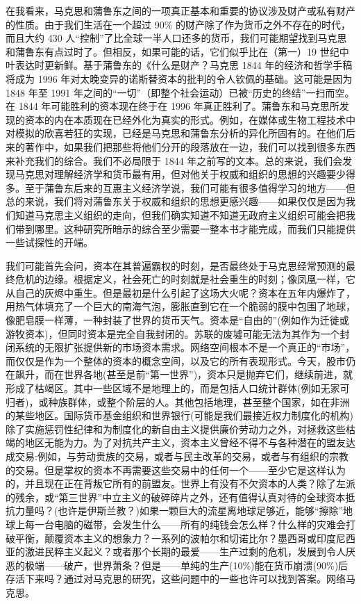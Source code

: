 \documentclass[DIV=12,%
               BCOR=0mm,%
               headinclude=false,%
               footinclude=false,open=any,%
               fontsize=10pt,%
               oneside,%
               paper=210mm:11in]%
               {scrbook}
\begin{document}
在我看来，马克思和蒲鲁东之间的一项真正基本和重要的协议涉及财产或私有财产的性质。由于我们生活在一个超过 90\% 的财产除了作为货币之外不存在的时代，而且大约 430 人“控制”了比全球一半人口还多的货币，我们可能期望找到马克思和蒲鲁东有点过时了。但相反，如果可能的话，它们似乎比在（第一）19 世纪中叶表达时更新鲜。基于蒲鲁东的《什么是财产？马克思 1844 年的经济和哲学手稿将成为 1996 年对太晚变异的诺斯替资本的批判的令人钦佩的基础。这可能是因为 1848 年至 1991 年之间的“一切”（即整个社会运动）已被“历史的终结”一扫而空。在 1844 年可能胜利的资本现在终于在 1996 年真正胜利了。蒲鲁东和马克思所发现的资本的内在本质现在已经外化为真实的形式。例如，在媒体或生物工程技术中对模拟的欣喜若狂的实现，已经是马克思和蒲鲁东分析的异化所固有的。在他们后来的著作中，如果我们把那些将他们分开的段落放在一边，我们可以找到很多东西来补充我们的综合。我们不必局限于 1844 年之前写的文本。总的来说，我们会发现马克思对理解经济学和货币最有用，但对他关于权威和组织的思想的兴趣要少得多。至于蒲鲁东后来的互惠主义经济学说，我们可能有很多值得学习的地方——但总的来说，我们将对蒲鲁东关于权威和组织的思想更感兴趣——如果仅仅是因为我们知道马克思主义组织的走向，但我们确实知道不知道无政府主义组织可能会把我们带到哪里。这种研究所暗示的综合至少需要一整本书才能完成，而我们只能提供一些试探性的开端。


我们可能首先会问，资本在其普遍霸权的时刻，是否最终处于马克思经常预测的最终危机的边缘。根据定义，社会死亡的时刻就是社会重生的时刻；像凤凰一样，它从自己的灰烬中重生。但是最初是什么引起了这场大火呢？资本在五年内爆炸了，用热气体填充了一个巨大的南海气泡，膨胀直到它在一个脆弱的膜中包围了地球，像肥皂膜一样薄，一种封装了世界的货币天气。资本是“自由的”(例如作为迁徙或游牧资本)，但同时资本是完全自我封闭的。苏联的废墟可能无法为其作为一个封闭系统的无限扩张提供新的市场资本需求。网络空间根本不是一个真正的“市场”，而仅仅是作为一个整体的资本的概念空间，以及它的所有表现形式。今天，股市仍在飙升，而在世界各地(甚至是前“第一世界”)，资本只是抛弃它们，继续前进，就形成了枯竭区。其中一些区域不是地理上的，而是包括人口统计群体(例如无家可归者)，或种族群体，或整个阶层的人。其他包括地理，甚至整个国家，如在非洲的某些地区。国际货币基金组织和世界银行(可能是我们最接近权力制度化的机构)除了实施惩罚性纪律和为制度化的新自由主义提供廉价劳动力之外，对拯救这些枯竭的地区无能为力。为了对抗共产主义，资本主义曾经不得不与各种潜在的盟友达成交易:例如，与劳动贵族的交易，或者与民主改革的交易，或者与有组织的宗教的交易。但是掌权的资本不再需要这些交易中的任何一个——至少它是这样认为的，并且现在正在背叛它所有的前盟友。世界上有没有不欠资本的人类？除了左派的残余，或“第三世界”中立主义的破碎碎片之外，还有值得认真对待的全球资本抵抗力量吗？(也许是伊斯兰教？)如果一颗巨大的流星离地球足够近，能够“擦除”地球上每一台电脑的磁带，会发生什么——所有的纯钱会怎么样？什么样的灾难会打破平衡，颠覆资本主义的想象力？一系列的波帕尔和切诺比尔？墨西哥或印度尼西亚的激进民粹主义起义？或者那个长期的最爱——生产过剩的危机，发展到令人厌恶的极端——破产，世界萧条？但是——单纯的生产(10\%)能在货币崩溃(90\%)后存活下来吗？通过对马克思的研究，这些问题中的一些也许可以找到答案。网络马克思。
\end{document}

